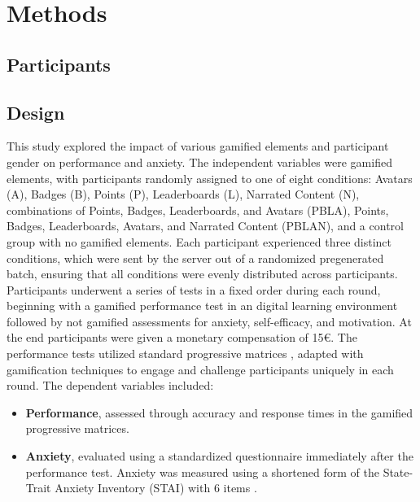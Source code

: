 \section{Methods}
\subsection{Participants}
\subsection{Design}
This study explored the impact of various gamified elements and participant gender on performance and anxiety.
The independent variables were gamified elements, with participants randomly assigned to one of eight conditions: Avatars (A), Badges (B), Points (P), Leaderboards (L), Narrated Content (N), combinations of Points, Badges, Leaderboards, and Avatars (PBLA), Points, Badges, Leaderboards, Avatars, and Narrated Content (PBLAN), and a control group with no gamified elements.
Each participant experienced three distinct conditions, which were sent by the server out of a randomized pregenerated batch, ensuring that all conditions were evenly distributed across participants.
Participants underwent a series of tests in a fixed order during each round, beginning with a gamified performance test in an digital learning environment followed by  not gamified assessments for anxiety, self-efficacy, and motivation.
At the end participants were given a monetary compensation of 15€.
The performance tests utilized standard progressive matrices , adapted with gamification techniques to engage and challenge participants uniquely in each round.
The dependent variables included:
\begin{itemize}
  \item \textbf{Performance}, assessed through accuracy and response times in the gamified progressive matrices.
  \item \textbf{Anxiety}, evaluated using a standardized questionnaire immediately after the performance test. Anxiety was measured using a shortened form of the State-Trait Anxiety Inventory (STAI) with 6 items \parencite{marteauDevelopmentSixitemShortform1992}.
\end{itemize}


